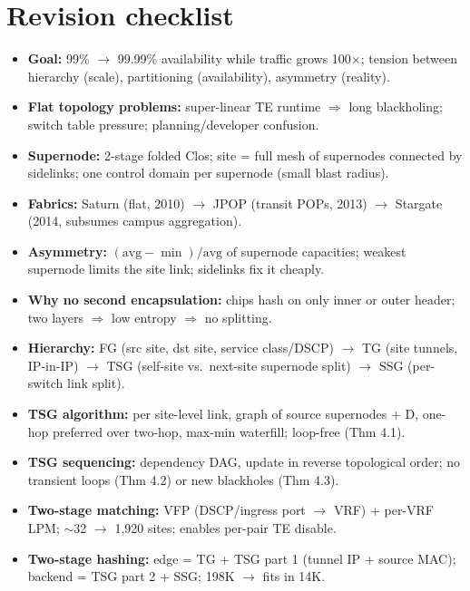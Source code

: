 \section{Revision checklist}
\begin{itemize}
\item \textbf{Goal:} 99\% $\to$ 99.99\% availability while traffic grows 100$\times$; tension between hierarchy (scale), partitioning (availability), asymmetry (reality).
\item \textbf{Flat topology problems:} super-linear TE runtime $\Rightarrow$ long blackholing; switch table pressure; planning/developer confusion.
\item \textbf{Supernode:} 2-stage folded Clos; site = full mesh of supernodes connected by sidelinks; one control domain per supernode (small blast radius).
\item \textbf{Fabrics:} Saturn (flat, 2010) $\to$ JPOP (transit POPs, 2013) $\to$ Stargate (2014, subsumes campus aggregation).
\item \textbf{Asymmetry:} $(\text{avg}-\min)/\text{avg}$ of supernode capacities; weakest supernode limits the site link; sidelinks fix it cheaply.
\item \textbf{Why no second encapsulation:} chips hash on only inner or outer header; two layers $\Rightarrow$ low entropy $\Rightarrow$ no splitting.
\item \textbf{Hierarchy:} FG (src site, dst site, service class/DSCP) $\to$ TG (site tunnels, IP-in-IP) $\to$ TSG (self-site vs.\ next-site supernode split) $\to$ SSG (per-switch link split).
\item \textbf{TSG algorithm:} per site-level link, graph of source supernodes + D, one-hop preferred over two-hop, max-min waterfill; loop-free (Thm 4.1).
\item \textbf{TSG sequencing:} dependency DAG, update in reverse topological order; no transient loops (Thm 4.2) or new blackholes (Thm 4.3).
\item \textbf{Two-stage matching:} VFP (DSCP/ingress port $\to$ VRF) + per-VRF LPM; $\sim$32 $\to$ 1,920 sites; enables per-pair TE disable.
\item \textbf{Two-stage hashing:} edge = TG + TSG part 1 (tunnel IP + source MAC); backend = TSG part 2 + SSG; 198K $\to$ fits in 14K.
\end{itemize}
